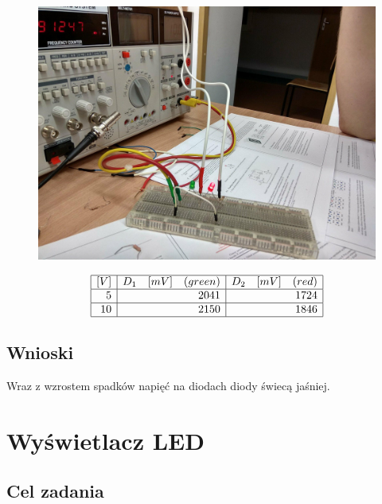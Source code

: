 \documentclass[polish,polish,a4paper]{article}
\begin{document}
\begin{figure}[H]
	\centering
	\includegraphics[scale=0.2]{10v.jpg}
\end{figure}

\begin{spacing}{1.5}
	\begin{equation*}
	\begin{array}{|r|r|r|}
	\hline
	\multicolumn{1}{|c|}{[V]}&\multicolumn{1}{c|}{D_{1}\quad[mV] \quad (green)}&\multicolumn{1}{c|}{D_{2}\quad[mV] \quad (red)}\\\hline
	5&2041&1724\\\hline
	10&2150&1846\\\hline
	\end{array}
	\end{equation*}
\end{spacing}

\subsection{Wnioski}

Wraz z wzrostem spadków napięć na diodach diody świecą jaśniej.

\section{Wyświetlacz LED}

\subsection{Cel zadania}
\end{document}
